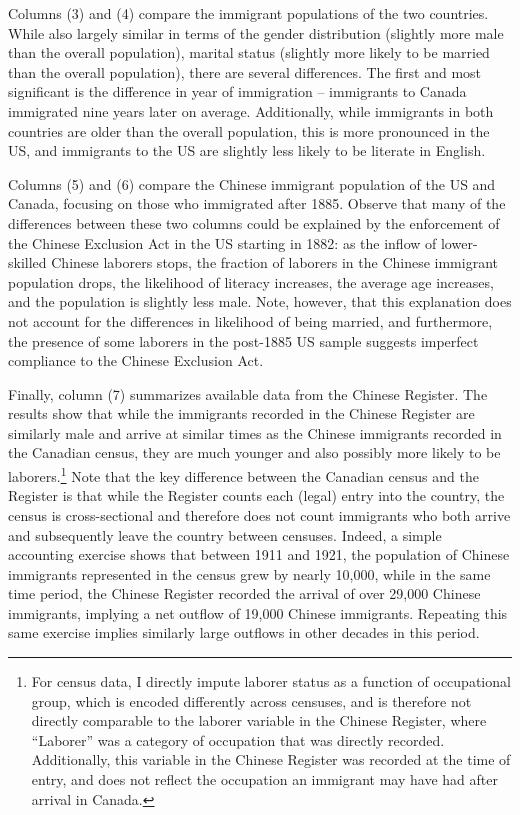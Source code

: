 \documentclass[12pt]{article}
\begin{document}
Columns (3) and (4) compare the immigrant populations of the two countries. While also largely similar in terms of the gender distribution (slightly more male than the overall population), marital status (slightly more likely to be married than the overall population), there are several differences. The first and most significant is the difference in year of immigration -- immigrants to Canada immigrated nine years later on average. Additionally, while immigrants in both countries are older than the overall population, this is more pronounced in the US, and immigrants to the US are slightly less likely to be literate in English. 

Columns (5) and (6) compare the Chinese immigrant population of the US and Canada, focusing on those who immigrated after 1885. Observe that many of the differences between these two columns could be explained by the enforcement of the Chinese Exclusion Act in the US starting in 1882: as the inflow of lower-skilled Chinese laborers stops, the fraction of laborers in the Chinese immigrant population drops, the likelihood of literacy increases, the average age increases, and the population is slightly less male. Note, however, that this explanation does not account for the differences in likelihood of being married, and furthermore, the presence of some laborers in the post-1885 US sample suggests imperfect compliance to the Chinese Exclusion Act. 

Finally, column (7) summarizes available data from the Chinese Register. The results show that while the immigrants recorded in the Chinese Register are similarly male and arrive at similar times as the Chinese immigrants recorded in the Canadian census, they are much younger and also possibly more likely to be laborers.\footnote{For census data, I directly impute laborer status as a function of occupational group, which is encoded differently across censuses, and is therefore not directly comparable to the laborer variable in the Chinese Register, where ``Laborer'' was a category of occupation that was directly recorded. Additionally, this variable in the Chinese Register was recorded at the time of entry, and does not reflect the occupation an immigrant may have had after arrival in Canada.}
Note that the key difference between the Canadian census and the Register is that while the Register counts each (legal) entry into the country, the census is cross-sectional and therefore does not count immigrants who both arrive and subsequently leave the country between censuses. Indeed, a simple accounting exercise shows that between 1911 and 1921, the population of Chinese immigrants represented in the census grew by nearly 10,000, while in the same time period, the Chinese Register recorded the arrival of over 29,000 Chinese immigrants, implying a net outflow of 19,000 Chinese immigrants. Repeating this same exercise implies similarly large outflows in other decades in this period. 
\end{document}
